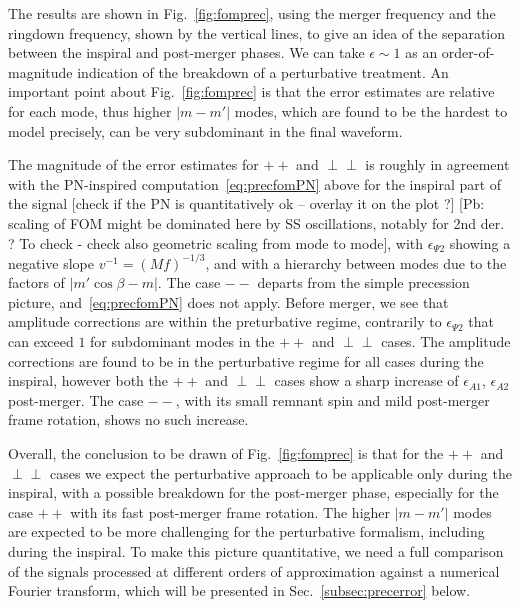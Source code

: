 \documentclass[aps,showpacs,twocolumn,
prd,superscriptaddress,nofootinbib]{revtex4-1}
\newcommand{\SM}[1]{{\color{Red} #1}}
\begin{document}
The results are shown in Fig.~\ref{fig:fomprec}, using the merger frequency and the ringdown frequency, shown by the vertical lines, to give an idea of the separation between the inspiral and post-merger phases. We can take $\epsilon \sim 1$ as an order-of-magnitude indication of the breakdown of a perturbative treatment. An important point about Fig.~\ref{fig:fomprec} is that the error estimates are relative for each mode, thus higher $|m-m'|$ modes, which are found to be the hardest to model precisely, can be very subdominant in the final waveform. 

The magnitude of the error estimates for $++$ and $\perp\perp$ is roughly in agreement with the PN-inspired computation~\eqref{eq:precfomPN} above for the inspiral part of the signal \SM{[check if the PN is quantitatively ok -- overlay it on the plot ?]} \SM{[Pb: scaling of FOM might be dominated here by SS oscillations, notably for 2nd der. ? To check - check also geometric scaling from mode to mode]}, with $\epsilon_{\Psi 2}$ showing a negative slope $v^{-1}=(Mf)^{-1/3}$, and with a hierarchy between modes due to the factors of $|m' \cos \beta - m|$. The case $--$ departs from the simple precession picture, and~\eqref{eq:precfomPN} does not apply. Before merger, we see that amplitude corrections are within the preturbative regime, contrarily to $\epsilon_{\Psi 2}$ that can exceed $1$ for subdominant modes in the $++$ and $\perp\perp$ cases. The amplitude corrections are found to be in the perturbative regime for all cases during the inspiral, however both the $++$ and $\perp\perp$ cases show a sharp increase of $\epsilon_{A1}$, $\epsilon_{A2}$ post-merger. The case $--$, with its small remnant spin and mild post-merger frame rotation, shows no such increase.

Overall, the conclusion to be drawn of Fig.~\ref{fig:fomprec} is that for the $++$ and $\perp\perp$ cases we expect the perturbative approach to be applicable only during the inspiral, with a possible breakdown for the post-merger phase, especially for the case $++$ with its fast post-merger frame rotation. The higher $|m-m'|$ modes are expected to be more challenging for the perturbative formalism, including during the inspiral. To make this picture quantitative, we need a full comparison of the signals processed at different orders of approximation against a numerical Fourier transform, which will be presented in Sec.~\ref{subsec:precerror} below.
\end{document}
